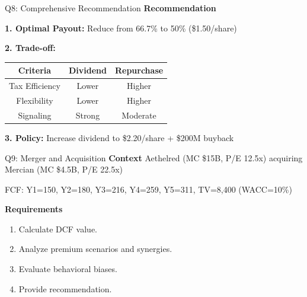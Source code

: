 \documentclass[aspectratio=169,10pt]{beamer}
\renewcommand{\small}{\fontsize{6pt}{7.5pt}\selectfont}
\renewcommand{\large}{\fontsize{8pt}{10pt}\selectfont}
\newcommand{\question}[1]{{\large\bfseries\color{crimson}#1}}
\begin{document}
	\begin{frame}{Q8: Comprehensive Recommendation}
		\question{Recommendation}
		\small
		
		\textbf{1. Optimal Payout:}
		Reduce from 66.7\% to 50\% (\$1.50/share)
		
		\vspace{0.1cm}
		\textbf{2. Trade-off:}
		\begin{table}[h]
			\centering
			\begin{tabular}{|c|c|c|}
				\hline
				\textbf{Criteria} & \textbf{Dividend} & \textbf{Repurchase} \\
				\hline
				Tax Efficiency & Lower & Higher \\
				Flexibility & Lower & Higher \\
				Signaling & Strong & Moderate \\
				\hline
			\end{tabular}
		\end{table}
		
		\vspace{0.1cm}
		\textbf{3. Policy:}
		Increase dividend to \$2.20/share + \$200M buyback
	\end{frame}
	
	\begin{frame}{Q9: Merger and Acquisition}
		\question{Context}
		\small
		Aethelred (MC \$15B, P/E 12.5x) acquiring Mercian (MC \$4.5B, P/E 22.5x)
		
		\vspace{0.1cm}
		FCF: Y1=150, Y2=180, Y3=216, Y4=259, Y5=311, TV=8,400 (WACC=10\%)
		
		\vspace{0.1cm}
		\question{Requirements}
		\begin{enumerate}
			\item Calculate DCF value.
			\item Analyze premium scenarios and synergies.
			\item Evaluate behavioral biases.
			\item Provide recommendation.
		\end{enumerate}
	\end{frame}
	
\end{document}
